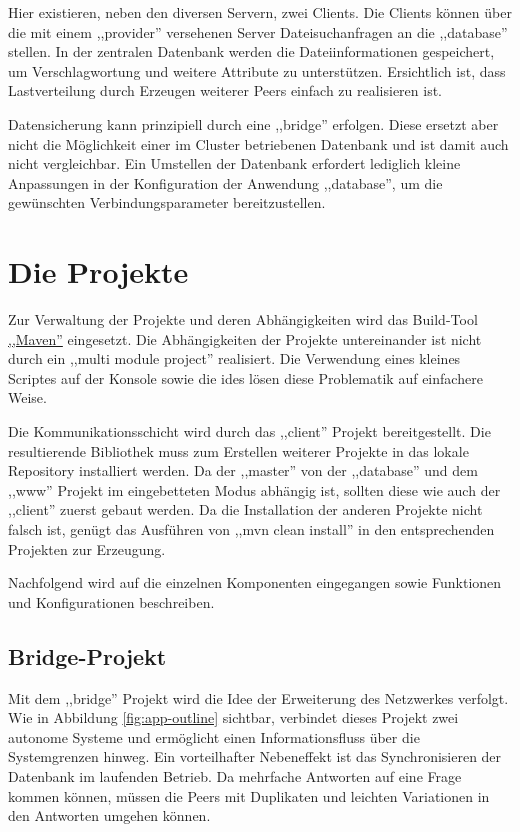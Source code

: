 \documentclass[oneside, ngerman, toc=bibliography,bibliography=totoc,listof=entryprefix, open=right,numbers=noenddot,fontsize=12pt]{scrbook}
\begin{document}
 

Hier existieren, neben den diversen Servern, zwei Clients. Die Clients können über die mit einem ,,provider'' versehenen Server Dateisuchanfragen an die ,,database'' stellen.
In der zentralen Datenbank werden die Dateiinformationen gespeichert, um Verschlagwortung und weitere Attribute zu unterstützen.
Ersichtlich ist, dass Lastverteilung durch Erzeugen weiterer Peers einfach zu realisieren ist. 

Datensicherung kann prinzipiell durch eine ,,bridge'' erfolgen. Diese ersetzt aber nicht die Möglichkeit einer im Cluster betriebenen Datenbank und ist damit auch nicht vergleichbar. Ein Umstellen der Datenbank erfordert lediglich kleine  Anpassungen  in der Konfiguration  der Anwendung ,,database'', um die gewünschten Verbindungsparameter bereitzustellen.


\section{Die Projekte}
Zur Verwaltung der Projekte und deren Abhängigkeiten wird das Build-Tool \href{https://maven.apache.org/}{,,Maven''} eingesetzt.
Die Abhängigkeiten der Projekte untereinander ist nicht durch ein  ,,multi module project'' realisiert. Die Verwendung eines  kleines Scriptes auf der Konsole sowie die \acrshort{ide}s lösen diese Problematik auf einfachere Weise. 

Die Kommunikationsschicht wird durch das ,,client'' Projekt bereitgestellt.
Die resultierende Bibliothek muss zum Erstellen weiterer Projekte in das lokale Repository installiert werden.
Da der ,,master'' von der ,,database'' und dem ,,www'' Projekt im eingebetteten Modus abhängig ist, sollten diese wie auch der ,,client'' zuerst gebaut werden.
Da die Installation der anderen Projekte nicht falsch ist, genügt das Ausführen von ,,mvn clean install'' in den entsprechenden Projekten zur Erzeugung.

Nachfolgend wird auf die einzelnen Komponenten eingegangen sowie Funktionen und Konfigurationen beschreiben.


\subsection{Bridge-Projekt}
Mit dem ,,bridge'' Projekt wird die Idee der Erweiterung des Netzwerkes verfolgt. Wie in Abbildung \ref{fig:app-outline} sichtbar, verbindet dieses Projekt zwei autonome Systeme und ermöglicht einen Informationsfluss über die Systemgrenzen hinweg. Ein vorteilhafter Nebeneffekt ist das Synchronisieren der Datenbank im laufenden Betrieb. Da mehrfache Antworten auf eine Frage kommen können, müssen die Peers mit Duplikaten und leichten Variationen in den Antworten umgehen können.
\end{document}
